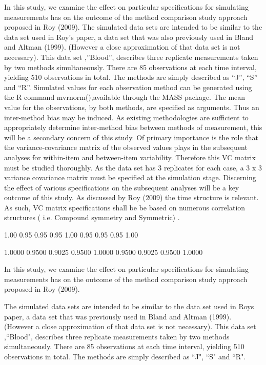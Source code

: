 In this study, we examine the effect on particular specifications for simulating measurements has on the outcome of the method comparison study approach proposed in Roy (2009).
The simulated data sets are intended to be similar to the data set used in Roy’s paper, a data set  that was also previously used in Bland and Altman (1999). (However a close approximation of that data set is not necessary). This data set ,”Blood”, describes three replicate measurements taken by two methods simultaneously. There are 85 observations at each time interval, yielding 510 observations in total. The methods  are simply described as “J”, “S” and “R”.
Simulated values for each observation method can be generated using the R command  mvrnorm(),available through the MASS package.
The mean value for the observations, by both methods, are specified as arguments. Thus an inter-method bias may be induced.  As existing methodologies are sufficient to appropriately determine inter-method bias between methods of measurement,  this will be a secondary concern of this study.
Of primary importance is the role that the variance-covariance matrix of the observed values plays in the subsequent analyses for within-item and between-item variability. Therefore this VC matrix must be studied thoroughly.
As the data set has 3 replicates for each case, a 3 x 3 variance covariance matrix must be specified at the simulation stage.  Discerning the effect of various specifications on the subsequent analyses will be a key outcome of this study.
As discussed by Roy (2009) the time structure is relevant. As such,  VC matrix specifications shall be be based on numerous correlation structures ( i.e. Compound symmetry and Symmetric) .

1.00 0.95 0.95
0.95 1.00 0.95
0.95 0.95 1.00

 


1.0000 0.9500 0.9025
0.9500 1.0000 0.9500
0.9025 0.9500 1.0000

 



\pagestyle{fancy}
\setmarginsrb{20mm}{0mm}{20mm}{25mm}{12mm}{11mm}{0mm}{11mm}



\tableofcontents
\newpage
In this study, we examine the effect on particular specifications for simulating measurements has on the outcome of the method comparison study approach proposed in Roy (2009).

The simulated data sets are intended to be similar to the data set used in Roys paper, a data set that was previously used in Bland and Altman (1999). (However a close approximation of that data set is not necessary). This data set ,``Blood", describes three replicate measurements taken by two methods simultaneously. There are 85 observations at each time interval, yielding 510 observations in total. The methods  are simply described as ``J", ``S" and ``R".

